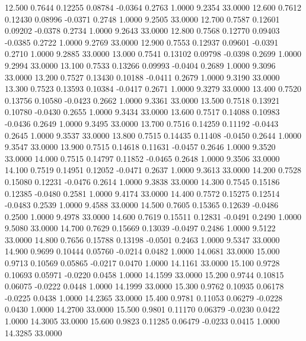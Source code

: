   12.500   0.7644   0.12255   0.08784  -0.0364   0.2763   1.0000   9.2354  33.0000
  12.600   0.7612   0.12430   0.08996  -0.0371   0.2748   1.0000   9.2505  33.0000
  12.700   0.7587   0.12601   0.09202  -0.0378   0.2734   1.0000   9.2643  33.0000
  12.800   0.7568   0.12770   0.09403  -0.0385   0.2722   1.0000   9.2769  33.0000
  12.900   0.7553   0.12937   0.09601  -0.0391   0.2710   1.0000   9.2885  33.0000
  13.000   0.7541   0.13102   0.09798  -0.0398   0.2699   1.0000   9.2994  33.0000
  13.100   0.7533   0.13266   0.09993  -0.0404   0.2689   1.0000   9.3096  33.0000
  13.200   0.7527   0.13430   0.10188  -0.0411   0.2679   1.0000   9.3190  33.0000
  13.300   0.7523   0.13593   0.10384  -0.0417   0.2671   1.0000   9.3279  33.0000
  13.400   0.7520   0.13756   0.10580  -0.0423   0.2662   1.0000   9.3361  33.0000
  13.500   0.7518   0.13921   0.10780  -0.0430   0.2655   1.0000   9.3434  33.0000
  13.600   0.7517   0.14088   0.10983  -0.0436   0.2649   1.0000   9.3495  33.0000
  13.700   0.7516   0.14259   0.11192  -0.0443   0.2645   1.0000   9.3537  33.0000
  13.800   0.7515   0.14435   0.11408  -0.0450   0.2644   1.0000   9.3547  33.0000
  13.900   0.7515   0.14618   0.11631  -0.0457   0.2646   1.0000   9.3520  33.0000
  14.000   0.7515   0.14797   0.11852  -0.0465   0.2648   1.0000   9.3506  33.0000
  14.100   0.7519   0.14951   0.12052  -0.0471   0.2637   1.0000   9.3613  33.0000
  14.200   0.7528   0.15080   0.12231  -0.0476   0.2614   1.0000   9.3838  33.0000
  14.300   0.7545   0.15186   0.12385  -0.0480   0.2581   1.0000   9.4174  33.0000
  14.400   0.7572   0.15275   0.12514  -0.0483   0.2539   1.0000   9.4588  33.0000
  14.500   0.7605   0.15365   0.12639  -0.0486   0.2500   1.0000   9.4978  33.0000
  14.600   0.7619   0.15511   0.12831  -0.0491   0.2490   1.0000   9.5080  33.0000
  14.700   0.7629   0.15669   0.13039  -0.0497   0.2486   1.0000   9.5122  33.0000
  14.800   0.7656   0.15788   0.13198  -0.0501   0.2463   1.0000   9.5347  33.0000
  14.900   0.9699   0.10444   0.05760  -0.0214   0.0482   1.0000  14.0681  33.0000
  15.000   0.9713   0.10569   0.05865  -0.0217   0.0470   1.0000  14.1161  33.0000
  15.100   0.9728   0.10693   0.05971  -0.0220   0.0458   1.0000  14.1599  33.0000
  15.200   0.9744   0.10815   0.06075  -0.0222   0.0448   1.0000  14.1999  33.0000
  15.300   0.9762   0.10935   0.06178  -0.0225   0.0438   1.0000  14.2365  33.0000
  15.400   0.9781   0.11053   0.06279  -0.0228   0.0430   1.0000  14.2700  33.0000
  15.500   0.9801   0.11170   0.06379  -0.0230   0.0422   1.0000  14.3005  33.0000
  15.600   0.9823   0.11285   0.06479  -0.0233   0.0415   1.0000  14.3285  33.0000
